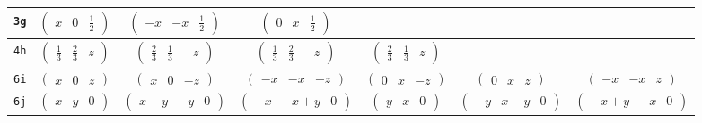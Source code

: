 \documentclass[fleqn,9pt,landscape]{jsarticle}
\begin{document}
\begin{center}
\begin{longtable}{ccccccc}
{\tt 3g} & $ \begin{pmatrix} x & 0 & \frac{1}{2} \end{pmatrix} $ & $ \begin{pmatrix} - x & - x & \frac{1}{2} \end{pmatrix} $ & $ \begin{pmatrix} 0 & x & \frac{1}{2} \end{pmatrix} $ & $  $ & $  $ & $  $ \\ \hline
{\tt 4h} & $ \begin{pmatrix} \frac{1}{3} & \frac{2}{3} & z \end{pmatrix} $ & $ \begin{pmatrix} \frac{2}{3} & \frac{1}{3} & - z \end{pmatrix} $ & $ \begin{pmatrix} \frac{1}{3} & \frac{2}{3} & - z \end{pmatrix} $ & $ \begin{pmatrix} \frac{2}{3} & \frac{1}{3} & z \end{pmatrix} $ & $  $ & $  $ \\ \hline
{\tt 6i} & $ \begin{pmatrix} x & 0 & z \end{pmatrix} $ & $ \begin{pmatrix} x & 0 & - z \end{pmatrix} $ & $ \begin{pmatrix} - x & - x & - z \end{pmatrix} $ & $ \begin{pmatrix} 0 & x & - z \end{pmatrix} $ & $ \begin{pmatrix} 0 & x & z \end{pmatrix} $ & $ \begin{pmatrix} - x & - x & z \end{pmatrix} $ \\ \hline
{\tt 6j} & $ \begin{pmatrix} x & y & 0 \end{pmatrix} $ & $ \begin{pmatrix} x - y & - y & 0 \end{pmatrix} $ & $ \begin{pmatrix} - x & - x + y & 0 \end{pmatrix} $ & $ \begin{pmatrix} y & x & 0 \end{pmatrix} $ & $ \begin{pmatrix} - y & x - y & 0 \end{pmatrix} $ & $ \begin{pmatrix} - x + y & - x & 0 \end{pmatrix} $ \\ \hline

\end{longtable}
\end{center}
\end{document}
